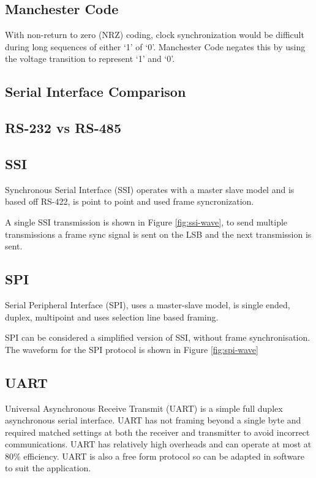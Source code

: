 \subsection{Manchester Code}
With non-return to zero (NRZ) coding, clock synchronization would be difficult during long sequences
of either `1' of `0'. Manchester Code negates this by using the voltage transition to represent `1'
and `0'.


\subsection{Serial Interface Comparison}




\subsection{RS-232 vs RS-485}


\subsection{SSI}
Synchronous Serial Interface (SSI) operates with a master slave model and is based off RS-422, is
point to point and used frame syncronization.



A single SSI transmission is shown in Figure \ref{fig:ssi-wave}, to send multiple transmissions a
frame sync signal is sent on the LSB and the next transmission is sent.


\subsection{SPI}
Serial Peripheral Interface (SPI), uses a master-slave model, is single ended, duplex, multipoint
and uses selection line based framing.


SPI can be considered a simplified version of SSI, without frame synchronisation. The waveform for
the SPI protocol is shown in Figure \ref{fig:spi-wave}

\subsection{UART}
Universal Asynchronous Receive Transmit (UART) is a simple full duplex asynchronous serial
interface. UART has not framing beyond a single byte and required matched settings at both the
receiver and transmitter to avoid incorrect communications. UART has relatively high overheads and
can operate at most at 80\% efficiency. UART is also a free form protocol so can be adapted in
software to suit the application.

